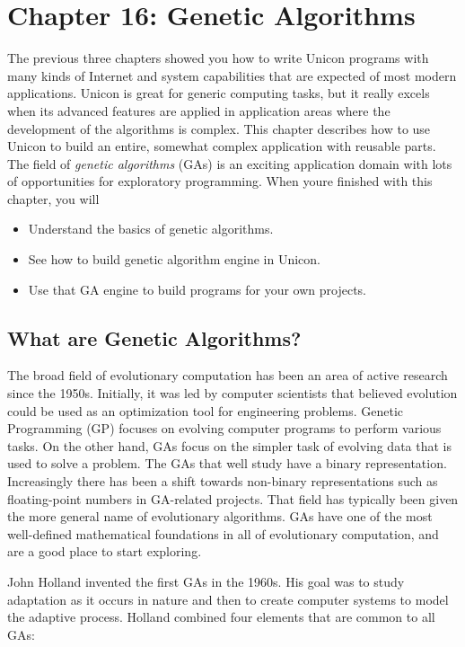 \clearpage\section{Chapter 16: Genetic Algorithms}
The previous three chapters showed you how to write Unicon programs with
many kinds of Internet and system capabilities that are expected of
most modern applications. Unicon is great for generic computing tasks,
but it really excels when its advanced features are applied in
application areas where the development of the algorithms is complex.
This chapter describes how to use Unicon to build an entire, somewhat
complex application with reusable parts. The field of \textit{genetic algorithms} (GAs) is an exciting application
domain with lots of opportunities for exploratory programming. When
you{\textquotesingle}re finished with this chapter, you will 

\begin{itemize}
\item Understand the basics of genetic algorithms.
\item See how to build genetic algorithm engine in Unicon.
\item Use that GA engine to build programs for your own projects.
\end{itemize}
\subsection{What are Genetic Algorithms?}
The broad field of evolutionary computation has been an area of active
research since the 1950s. Initially, it was led by computer scientists
that believed evolution could be used as an optimization tool for
engineering problems. Genetic Programming (GP) focuses on evolving
computer programs to perform various tasks. On the other hand, GAs
focus on the simpler task of evolving data that is used to solve a
problem. The GAs that we{\textquotesingle}ll study have a binary
representation. Increasingly there has been a shift towards non-binary
representations such as floating-point numbers in GA-related projects.
That field has typically been given the more general name of
evolutionary algorithms. GAs have one of the most well-defined
mathematical foundations in all of evolutionary computation, and are a
good place to start exploring. 

John Holland invented the first GAs in the 1960s. His goal was to study
adaptation as it occurs in nature and then to create computer systems
to model the adaptive process. Holland combined four elements that are
common to all GAs:

